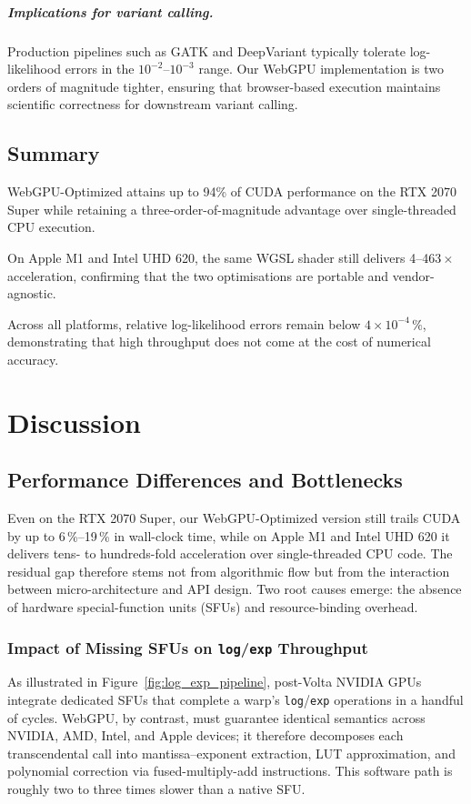 \documentclass[PhD]{PHlab-thesis}
\begin{document}
\paragraph{Implications for variant calling.}
Production pipelines such as GATK and DeepVariant typically tolerate log-likelihood errors in the $10^{-2}$–$10^{-3}$ range. Our WebGPU implementation is two orders of magnitude tighter, ensuring that browser-based execution maintains scientific correctness for downstream variant calling.

\section{Summary}
WebGPU-Optimized attains up to 94\% of CUDA performance on the RTX 2070 Super while retaining a three-order-of-magnitude advantage over single-threaded CPU execution.  

On Apple M1 and Intel UHD 620, the same WGSL shader still delivers 4–463\,$\times$ acceleration, confirming that the two optimisations are portable and vendor-agnostic.  

Across all platforms, relative log-likelihood errors remain below $4\times10^{-4}\,\%$, demonstrating that high throughput does not come at the cost of numerical accuracy.





\chapter{Discussion}

\section{Performance Differences and Bottlenecks}
Even on the RTX 2070 Super, our WebGPU-Optimized version still trails CUDA by up to 6\,\%--19\,\% in wall-clock time, while on Apple M1 and Intel UHD 620 it delivers tens- to hundreds-fold acceleration over single-threaded CPU code. The residual gap therefore stems not from algorithmic flow but from the interaction between micro-architecture and API design. Two root causes emerge: the absence of hardware special-function units (SFUs) and resource-binding overhead.

\subsection{Impact of Missing SFUs on \texttt{log}/\texttt{exp} Throughput}
As illustrated in Figure~\ref{fig:log_exp_pipeline}, post-Volta NVIDIA GPUs integrate dedicated SFUs that complete a warp’s \texttt{log}/\texttt{exp} operations in a handful of cycles.  
WebGPU, by contrast, must guarantee identical semantics across NVIDIA, AMD, Intel, and Apple devices; it therefore decomposes each transcendental call into mantissa–exponent extraction, LUT approximation, and polynomial correction via fused-multiply-add instructions. This software path is roughly two to three times slower than a native SFU.
\end{document}
